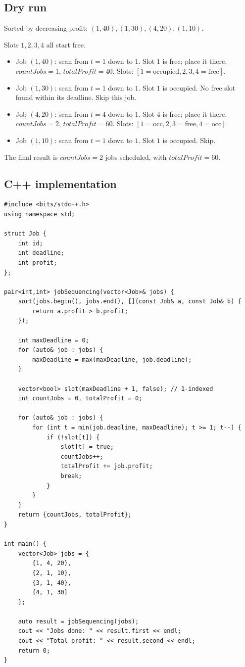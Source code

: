 \subsection*{Dry run}


Sorted by decreasing profit:
$(1,40), (1,30), (4,20), (1,10)$.

Slots $1, 2, 3, 4$ all start free.

\begin{itemize}
  \item Job $(1,40)$: scan from $t=1$ down to $1$. Slot $1$ is free; place
        it there. $\textit{countJobs}=1$, $\textit{totalProfit}=40$.
        Slots: $[1{=}\text{occupied}, 2,3,4{=}\text{free}]$.
  \item Job $(1,30)$: scan from $t=1$ down to $1$. Slot $1$ is occupied.
        No free slot found within its deadline. Skip this job.
  \item Job $(4,20)$: scan from $t=4$ down to $1$. Slot $4$ is free; place
        it there. $\textit{countJobs}=2$, $\textit{totalProfit}=60$.
        Slots: $[1{=}\text{occ}, 2,3{=}\text{free}, 4{=}\text{occ}]$.
  \item Job $(1,10)$: scan from $t=1$ down to $1$. Slot $1$ is occupied.
        Skip.
\end{itemize}

The final result is $\textit{countJobs} = 2$ jobs scheduled, with
$\textit{totalProfit} = 60$.

\subsection*{C++ implementation}

\begin{lstlisting}
#include <bits/stdc++.h>
using namespace std;

struct Job {
    int id;
    int deadline;
    int profit;
};

pair<int,int> jobSequencing(vector<Job>& jobs) {
    sort(jobs.begin(), jobs.end(), [](const Job& a, const Job& b) {
        return a.profit > b.profit;
    });

    int maxDeadline = 0;
    for (auto& job : jobs) {
        maxDeadline = max(maxDeadline, job.deadline);
    }

    vector<bool> slot(maxDeadline + 1, false); // 1-indexed
    int countJobs = 0, totalProfit = 0;

    for (auto& job : jobs) {
        for (int t = min(job.deadline, maxDeadline); t >= 1; t--) {
            if (!slot[t]) {
                slot[t] = true;
                countJobs++;
                totalProfit += job.profit;
                break;
            }
        }
    }
    return {countJobs, totalProfit};
}

int main() {
    vector<Job> jobs = {
        {1, 4, 20},
        {2, 1, 10},
        {3, 1, 40},
        {4, 1, 30}
    };

    auto result = jobSequencing(jobs);
    cout << "Jobs done: " << result.first << endl;
    cout << "Total profit: " << result.second << endl;
    return 0;
}
\end{lstlisting}

